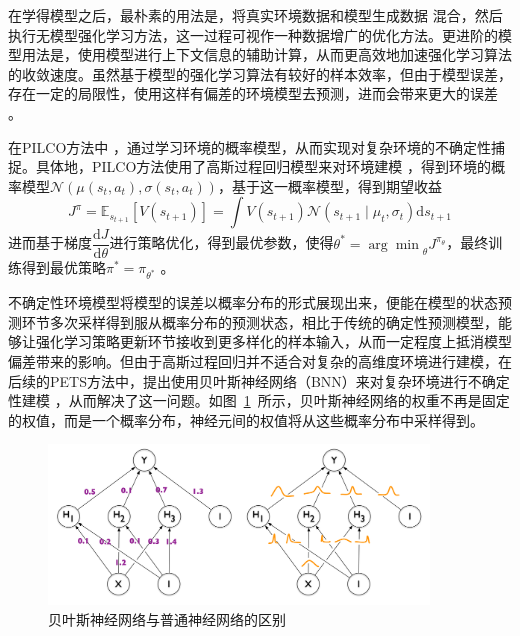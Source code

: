 在学得模型之后，最朴素的用法是，将真实环境数据和模型生成数据 混合，然后执行无模型强化学习方法，这一过程可视作一种数据增广的优化方法。更进阶的模型用法是，使用模型进行上下文信息的辅助计算，从而更高效地加速强化学习算法的收敛速度。虽然基于模型的强化学习算法有较好的样本效率，但由于模型误差，存在一定的局限性，使用这样有偏差的环境模型去预测，进而会带来更大的误差 \cite{zambaldi2018deep}。

在PILCO方法中 \cite{deisenroth2011pilco}，通过学习环境的概率模型，从而实现对复杂环境的不确定性捕捉。具体地，PILCO方法使用了高斯过程回归模型来对环境建模 \cite{quinonero2005unifying}，得到环境的概率模型$\mathcal{N}\left(\mu(s_t,a_t), \sigma(s_t,a_t)\right)$，基于这一概率模型，得到期望收益
\begin{equation}
    J^\pi=\mathbb{E}_{s_{t+1}}\left[V\left(s_{t+1}\right)\right]=\int V\left(s_{t+1}\right) \mathcal{N}\left(s_{t+1} \mid \mu_t, \sigma_t\right) \mathrm{d} s_{t+1}
\end{equation}
进而基于梯度$\dfrac{\mathrm{d}J}{\mathrm{d}\theta}$进行策略优化，得到最优参数，使得$\theta^* = {\arg\min}_\theta J^{\pi_\theta}$，最终训练得到最优策略$\pi^*=\pi_{\theta^*}$ 。\cite{peters2006policy}

不确定性环境模型将模型的误差以概率分布的形式展现出来，便能在模型的状态预测环节多次采样得到服从概率分布的预测状态，相比于传统的确定性预测模型，能够让强化学习策略更新环节接收到更多样化的样本输入，从而一定程度上抵消模型偏差带来的影响。但由于高斯过程回归并不适合对复杂的高维度环境进行建模，在后续的PETS方法中，提出使用贝叶斯神经网络（BNN）来对复杂环境进行不确定性建模 \cite{Blundell2015WeightNetworks}，从而解决了这一问题。如图~\ref{fig:BNN}~所示，贝叶斯神经网络的权重不再是固定的权值，而是一个概率分布，神经元间的权值将从这些概率分布中采样得到。

\begin{figure}[tbh]
\centering
\includegraphics[width=0.9\textwidth]{figures/BNN.png}
\caption{贝叶斯神经网络与普通神经网络的区别}
\label{fig:BNN}
\end{figure}

